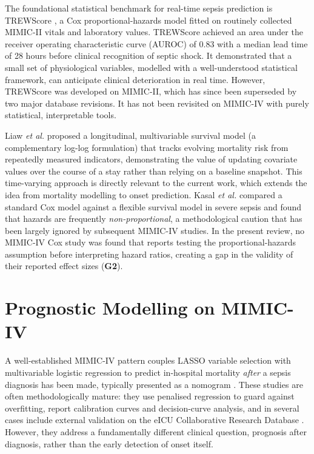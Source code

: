 The foundational statistical benchmark for real-time sepsis prediction is
TREWScore \cite{henry2015trewscore}, a Cox proportional-hazards model fitted on
routinely collected MIMIC-II vitals and laboratory values. TREWScore achieved an
area under the receiver operating characteristic curve (AUROC) of 0.83 with a
median lead time of 28 hours before clinical recognition of septic shock. It
demonstrated that a small set of physiological variables, modelled with a
well-understood statistical framework, can anticipate clinical deterioration in
real time. However, TREWScore was developed on MIMIC-II, which has since been
superseded by two major database revisions. It has not been revisited on
MIMIC-IV with purely statistical, interpretable tools.

Liaw \emph{et al.} \cite{liaw2019mortality} proposed a longitudinal,
multivariable survival model (a complementary log-log formulation) that tracks
evolving mortality risk from repeatedly measured indicators, demonstrating the
value of updating covariate values over the course of a stay rather than relying
on a baseline snapshot. This
time-varying approach is directly relevant to the current work, which extends
the idea from mortality modelling to onset prediction. Kasal \emph{et al.}
\cite{kasal2004cox} compared a standard Cox model against a flexible survival
model in severe sepsis and found that hazards are frequently
\emph{non-proportional}, a methodological caution that has been largely ignored
by subsequent MIMIC-IV studies. In the present review, no MIMIC-IV Cox study was
found that reports testing the proportional-hazards assumption before
interpreting hazard ratios, creating a gap in the validity of their reported
effect sizes (\textbf{G2}).

\section{Prognostic Modelling on MIMIC-IV}
\label{sec:prog}

A well-established MIMIC-IV pattern couples LASSO variable selection with
multivariable logistic regression to predict in-hospital mortality
\emph{after} a sepsis diagnosis has been made, typically presented as a
nomogram \cite{yuan2023nomogram}. These studies are often methodologically
mature: they use penalised regression to guard against overfitting, report
calibration curves and decision-curve analysis, and in several cases include
external validation on the eICU Collaborative Research Database
\cite{pollard2018eicu}. However, they address a fundamentally different clinical
question, prognosis after diagnosis, rather than the early detection of
onset itself.


